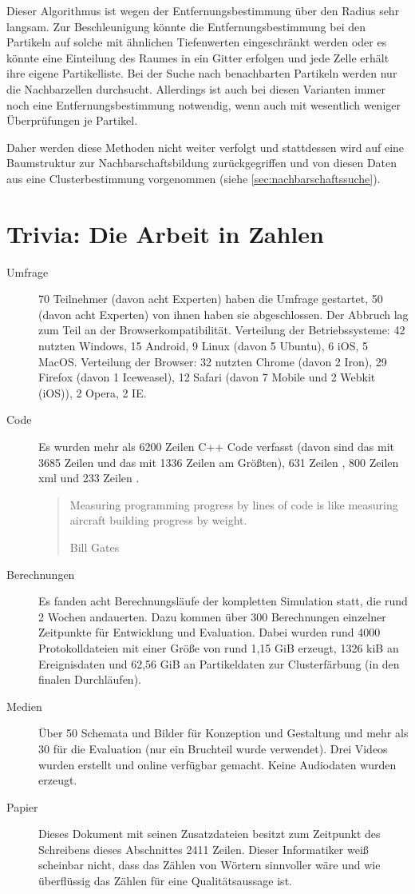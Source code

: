 Dieser Algorithmus ist wegen der Entfernungsbestimmung über den Radius sehr langsam. Zur Beschleunigung könnte die Entfernungsbestimmung bei den Partikeln auf solche mit ähnlichen Tiefenwerten eingeschränkt werden %
oder es könnte eine Einteilung des Raumes in ein Gitter erfolgen und jede Zelle erhält ihre eigene Partikelliste. Bei der Suche nach benachbarten Partikeln werden nur die Nachbarzellen durchsucht. Allerdings ist auch bei diesen Varianten immer noch eine Entfernungsbestimmung notwendig, wenn auch mit wesentlich weniger Überprüfungen je Partikel.

Daher werden diese Methoden nicht weiter verfolgt und stattdessen wird auf eine Baumstruktur zur Nachbarschaftsbildung zurückgegriffen und von diesen Daten aus eine Clusterbestimmung vorgenommen (siehe \autoref{sec:nachbarschaftssuche}).

\section{Trivia: Die Arbeit in Zahlen}\label{sec:trivia}
\begin{description}
	\item[Umfrage] 70 Teilnehmer (davon acht Experten) haben die Umfrage gestartet, 50 (davon acht Experten) von ihnen haben sie abgeschlossen. Der Abbruch lag zum Teil an der Browserkompatibilität. Verteilung der Betriebssysteme: 42 nutzten Windows, 15 Android, 9 Linux (davon 5 Ubuntu), 6 iOS, 5 MacOS. Verteilung der Browser: 32 nutzten Chrome (davon 2 Iron), 29 Firefox (davon 1 Iceweasel), 12 Safari (davon 7 Mobile und 2 Webkit (iOS)), 2 Opera, 2 IE.
	\item[Code] Es wurden mehr als 6200 Zeilen C++ Code verfasst (davon sind das \SECalc mit 3685 Zeilen und das  mit 1336 Zeilen am Größten), 631 Zeilen , 800 Zeilen \gls{xml} und 233 Zeilen .
	\blockquote[Bill Gates]{Measuring programming progress by lines of code is like measuring aircraft building progress by weight.}
	\item[Berechnungen] Es fanden acht Berechnungsläufe der kompletten Simulation statt, die rund 2 Wochen andauerten. Dazu kommen über 300 Berechnungen einzelner Zeitpunkte für Entwicklung und Evaluation. Dabei wurden rund 4000 Protokolldateien mit einer Größe von rund 1,15 \gls{GiB} erzeugt, 1326 \gls{kiB} an Ereignisdaten und 62,56 \gls{GiB} an Partikeldaten zur Clusterfärbung (in den finalen Durchläufen).
	\item[Medien] Über 50 Schemata und Bilder für Konzeption und Gestaltung und mehr als 30 für die Evaluation (nur ein Bruchteil wurde verwendet). Drei Videos wurden erstellt und online verfügbar gemacht. Keine Audiodaten wurden erzeugt.
	\item[Papier] Dieses Dokument mit seinen Zusatzdateien besitzt zum Zeitpunkt des Schreibens dieses Abschnittes 2411 Zeilen. Dieser Informatiker weiß scheinbar nicht, dass das Zählen von Wörtern sinnvoller wäre und wie überflüssig das Zählen für eine Qualitätsaussage ist.
\end{description}

